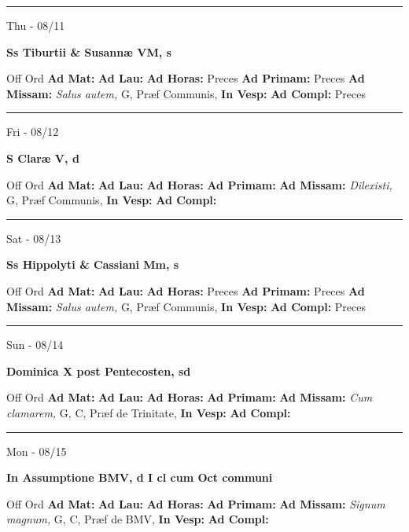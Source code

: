 \documentclass[letterpaper, 10pt]{article}
\begin{document}
\hrule
\begin{center}
Thu - 08/11
\end{center}\textbf{ \large Ss Tiburtii \& Susannæ VM, \textnormal{\normalsize s}}
\begin{justify}
Off Ord
\textbf{Ad Mat: }
\textbf{Ad Lau: }
\textbf{Ad Horas: }Preces
\textbf{Ad Primam: }Preces
\textbf{Ad Missam:} \textit{Salus autem, } G, Præf Communis, 
\textbf{In Vesp: }
\textbf{Ad Compl: }Preces\end{justify}



\hrule
\begin{center}
Fri - 08/12
\end{center}\textbf{ \large S Claræ V, \textnormal{\normalsize d}}
\begin{justify}
Off Ord
\textbf{Ad Mat: }
\textbf{Ad Lau: }
\textbf{Ad Horas: }
\textbf{Ad Primam: }
\textbf{Ad Missam:} \textit{Dilexisti, } G, Præf Communis, 
\textbf{In Vesp: }
\textbf{Ad Compl: }\end{justify}



\hrule
\begin{center}
Sat - 08/13
\end{center}\textbf{ \large Ss Hippolyti \& Cassiani Mm, \textnormal{\normalsize s}}
\begin{justify}
Off Ord
\textbf{Ad Mat: }
\textbf{Ad Lau: }
\textbf{Ad Horas: }Preces
\textbf{Ad Primam: }Preces
\textbf{Ad Missam:} \textit{Salus autem, } G, Præf Communis, 
\textbf{In Vesp: }
\textbf{Ad Compl: }Preces\end{justify}



\hrule
\begin{center}
Sun - 08/14
\end{center}\textbf{ \large Dominica X post Pentecosten, \textnormal{\normalsize sd}}
\begin{justify}
Off Ord
\textbf{Ad Mat: }
\textbf{Ad Lau: }
\textbf{Ad Horas: }
\textbf{Ad Primam: }
\textbf{Ad Missam:} \textit{Cum clamarem, } G, C, Præf de Trinitate, 
\textbf{In Vesp: }
\textbf{Ad Compl: }\end{justify}



\hrule
\begin{center}
Mon - 08/15
\end{center}\textbf{ \large In Assumptione BMV, \textnormal{\normalsize d I cl cum Oct communi}}
\begin{justify}
Off Ord
\textbf{Ad Mat: }
\textbf{Ad Lau: }
\textbf{Ad Horas: }
\textbf{Ad Primam: }
\textbf{Ad Missam:} \textit{Signum magnum, } G, C, Præf de BMV, 
\textbf{In Vesp: }
\textbf{Ad Compl: }\end{justify}
\end{document}
